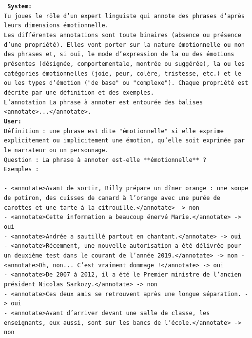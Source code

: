 {\tt\scriptsize
\textbf{System:}\\
Tu joues le rôle d'un expert linguiste qui annote des phrases d'après leurs dimensions émotionnelle.\\

Les différentes annotations sont toute binaires (absence ou présence d'une propriété). Elles vont porter sur la nature émotionnelle ou non des phrases et, si oui, le mode d'expression de la ou des émotions présentes (désignée, comportementale, montrée ou suggérée), la ou les catégories émotionnelles (joie, peur, colère, tristesse, etc.) et le ou les types d'émotion ("de base" ou "complexe"). Chaque propriété est décrite par une définition et des exemples.\\

L'annotation La phrase à annoter est entourée des balises <annotate>...</annotate>.\\

\textbf{User:}\\
Définition : une phrase est dite "émotionnelle" si elle exprime explicitement ou implicitement une émotion, qu'elle soit exprimée par le narrateur ou un personnage.\\

Question : La phrase à annoter est-elle **émotionnelle** ?\\

Exemples :\\\\
- <annotate>Avant de sortir, Billy prépare un dîner orange : une soupe de potiron, des cuisses de canard à l'orange avec une purée de carottes et une tarte à la citrouille.</annotate> -> non\\
- <annotate>Cette information a beaucoup énervé Marie.</annotate> -> oui\\
- <annotate>Andrée a sautillé partout en chantant.</annotate> -> oui\\
- <annotate>Récemment, une nouvelle autorisation a été délivrée pour un deuxième test dans le courant de l'année 2019.</annotate> -> non
- <annotate>Oh, non... C'est vraiment dommage !</annotate> -> oui\\
- <annotate>De 2007 à 2012, il a été le Premier ministre de l'ancien président Nicolas Sarkozy.</annotate> -> non\\
- <annotate>Ces deux amis se retrouvent après une longue séparation. -> oui\\
- <annotate>Avant d'arriver devant une salle de classe, les enseignants, eux aussi, sont sur les bancs de l'école.</annotate> -> non\\

}
